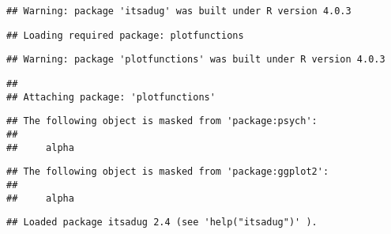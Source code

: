 \documentclass[
]{book}
\newenvironment{Shaded}{\begin{snugshade}}{\end{snugshade}}
\newcommand{\DataTypeTok}[1]{\textcolor[rgb]{0.13,0.29,0.53}{#1}}
\newcommand{\KeywordTok}[1]{\textcolor[rgb]{0.13,0.29,0.53}{\textbf{#1}}}
\newcommand{\NormalTok}[1]{#1}
\newcommand{\OperatorTok}[1]{\textcolor[rgb]{0.81,0.36,0.00}{\textbf{#1}}}
\newcommand{\OtherTok}[1]{\textcolor[rgb]{0.56,0.35,0.01}{#1}}
\newcommand{\StringTok}[1]{\textcolor[rgb]{0.31,0.60,0.02}{#1}}
\begin{document}
\begin{verbatim}
## Warning: package 'itsadug' was built under R version 4.0.3
\end{verbatim}

\begin{verbatim}
## Loading required package: plotfunctions
\end{verbatim}

\begin{verbatim}
## Warning: package 'plotfunctions' was built under R version 4.0.3
\end{verbatim}

\begin{verbatim}
## 
## Attaching package: 'plotfunctions'
\end{verbatim}

\begin{verbatim}
## The following object is masked from 'package:psych':
## 
##     alpha
\end{verbatim}

\begin{verbatim}
## The following object is masked from 'package:ggplot2':
## 
##     alpha
\end{verbatim}

\begin{verbatim}
## Loaded package itsadug 2.4 (see 'help("itsadug")' ).
\end{verbatim}

\begin{Shaded}
\end{Shaded}
\end{document}
